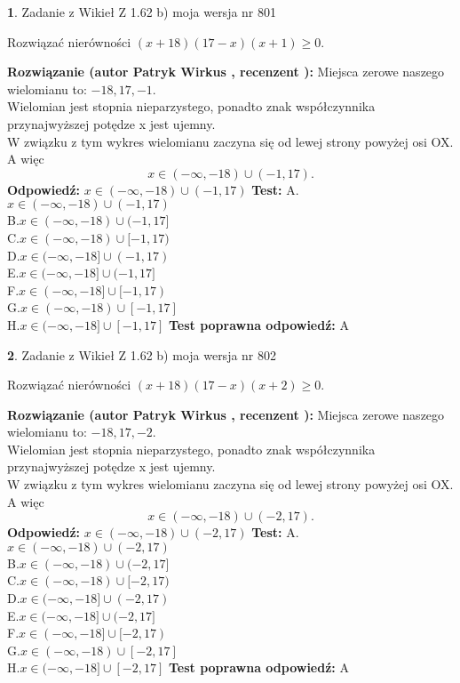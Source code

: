 \documentclass[12pt, a4paper]{article}
\theoremstyle{definition} %
\newtheorem{zad}{}
\newcommand{\zadStart}[1]{\begin{zad}#1\newline}
\newcommand{\zadStop}{\end{zad}}
\newcommand{\rozwStart}[2]{\noindent \textbf{Rozwiązanie (autor #1 , recenzent #2): }\newline}
\newcommand{\rozwStop}{\newline}
\newcommand{\odpStart}{\noindent \textbf{Odpowiedź:}\newline}
\newcommand{\odpStop}{\newline}
\newcommand{\testStart}{\noindent \textbf{Test:}\newline}
\newcommand{\testStop}{\newline}
\newcommand{\kluczStart}{\noindent \textbf{Test poprawna odpowiedź:}\newline}
\newcommand{\kluczStop}{\newline}
\begin{document}
\zadStart{Zadanie z Wikieł Z 1.62 b) moja wersja nr 801}

Rozwiązać nierówności $(x+18)(17-x)(x+1)\ge0$.
\zadStop
\rozwStart{Patryk Wirkus}{}
Miejsca zerowe naszego wielomianu to: $-18, 17, -1$.\\
Wielomian jest stopnia nieparzystego, ponadto znak współczynnika przy\linebreak najwyższej potędze x jest ujemny.\\ W związku z tym wykres wielomianu zaczyna się od lewej strony powyżej osi OX. A więc $$x \in (-\infty,-18) \cup (-1,17).$$
\rozwStop
\odpStart
$x \in (-\infty,-18) \cup (-1,17)$
\odpStop
\testStart
A.$x \in (-\infty,-18) \cup (-1,17)$\\
B.$x \in (-\infty,-18) \cup (-1,17]$\\
C.$x \in (-\infty,-18) \cup [-1,17)$\\
D.$x \in (-\infty,-18] \cup (-1,17)$\\
E.$x \in (-\infty,-18] \cup (-1,17]$\\
F.$x \in (-\infty,-18] \cup [-1,17)$\\
G.$x \in (-\infty,-18) \cup [-1,17]$\\
H.$x \in (-\infty,-18] \cup [-1,17]$
\testStop
\kluczStart
A
\kluczStop



\zadStart{Zadanie z Wikieł Z 1.62 b) moja wersja nr 802}

Rozwiązać nierówności $(x+18)(17-x)(x+2)\ge0$.
\zadStop
\rozwStart{Patryk Wirkus}{}
Miejsca zerowe naszego wielomianu to: $-18, 17, -2$.\\
Wielomian jest stopnia nieparzystego, ponadto znak współczynnika przy\linebreak najwyższej potędze x jest ujemny.\\ W związku z tym wykres wielomianu zaczyna się od lewej strony powyżej osi OX. A więc $$x \in (-\infty,-18) \cup (-2,17).$$
\rozwStop
\odpStart
$x \in (-\infty,-18) \cup (-2,17)$
\odpStop
\testStart
A.$x \in (-\infty,-18) \cup (-2,17)$\\
B.$x \in (-\infty,-18) \cup (-2,17]$\\
C.$x \in (-\infty,-18) \cup [-2,17)$\\
D.$x \in (-\infty,-18] \cup (-2,17)$\\
E.$x \in (-\infty,-18] \cup (-2,17]$\\
F.$x \in (-\infty,-18] \cup [-2,17)$\\
G.$x \in (-\infty,-18) \cup [-2,17]$\\
H.$x \in (-\infty,-18] \cup [-2,17]$
\testStop
\kluczStart
A
\kluczStop
\end{document}
